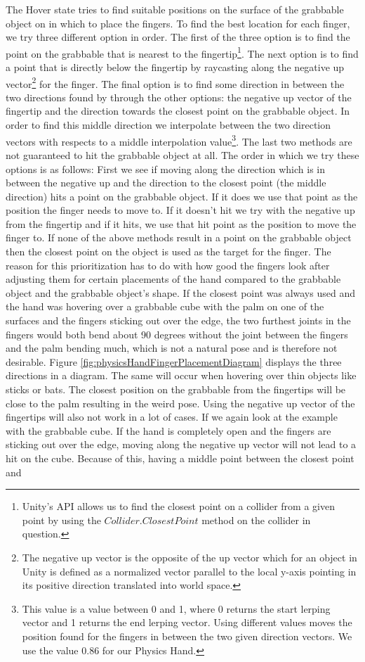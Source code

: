 The Hover state tries to find suitable positions on the surface of the grabbable object on in which to place the fingers. To find the best location for each finger, we try three different option in order. The first of the three option is to find the point on the grabbable that is nearest to the fingertip\footnote{Unity's API allows us to find the closest point on a collider from a given point by using the $Collider.ClosestPoint$ method on the collider in question.}. The next option is to find a point that is directly below the fingertip by raycasting along the negative up vector\footnote{The negative up vector is the opposite of the up vector which for an object in Unity is defined as a normalized vector parallel to the local y-axis pointing in its positive direction translated into world space.} for the finger. The final option is to find some direction in between the two directions found by through the other options: the negative up vector of the fingertip and the direction towards the closest point on the grabbable object. In order to find this middle direction we interpolate between the two direction vectors with respects to a middle interpolation value\footnote{This value is a value between 0 and 1, where 0 returns the start lerping vector and 1 returns the end lerping vector. Using different values moves the position found for the fingers in between the two given direction vectors. We use the value 0.86 for our Physics Hand.}. The last two methods are not guaranteed to hit the grabbable object at all. The order in which we try these options is as follows: First we see if moving along the direction which is in between the negative up and the direction to the closest point (the middle direction) hits a point on the grabbable object. If it does we use that point as the position the finger needs to move to. If it doesn't hit we try with the negative up from the fingertip and if it hits, we use that hit point as the position to move the finger to. If none of the above methods result in a point on the grabbable object then the closest point on the object is used as the target for the finger. The reason for this prioritization has to do with how good the fingers look after adjusting them for certain placements of the hand compared to the grabbable object and the grabbable object's shape. If the closest point was always used and the hand was hovering over a grabbable cube with the palm on one of the surfaces and the fingers sticking out over the edge, the two furthest joints in the fingers would both bend about 90 degrees without the joint between the fingers and the palm bending much, which is not a natural pose and is therefore not desirable. Figure \ref{fig:physicsHandFingerPlacementDiagram} displays the three directions in a diagram. The same will occur when hovering over thin objects like sticks or bats. The closest position on the grabbable from the fingertips will be close to the palm resulting in the weird pose. Using the negative up vector of the fingertips will also not work in a lot of cases. If we again look at the example with the grabbable cube. If the hand is completely open and the fingers are sticking out over the edge, moving along the negative up vector will not lead to a hit on the cube. Because of this, having a middle point between the closest point and 